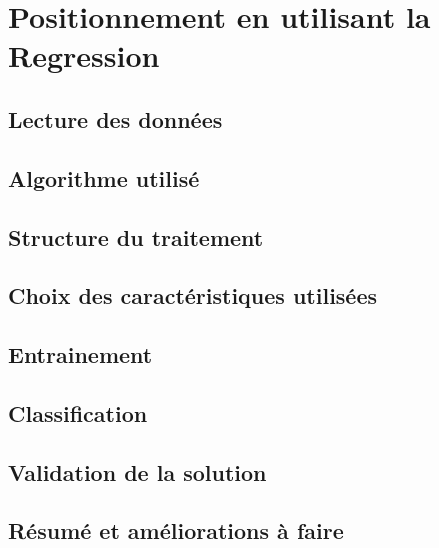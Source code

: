 \chapter{Positionnement en utilisant la Regression}

\section{Lecture des données}

\section{Algorithme utilisé}

\section{Structure du traitement}

\section{Choix des caractéristiques utilisées}

\section{Entrainement}

\section{Classification}

\section{Validation de la solution}

\section{Résumé et améliorations à faire}







